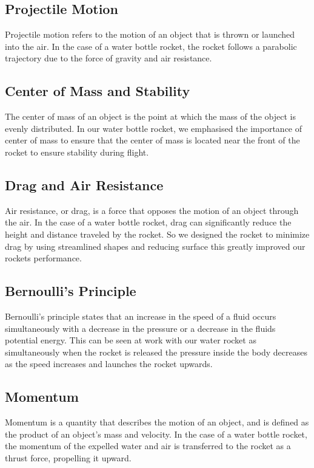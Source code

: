 \documentclass[11pt]{article}
\begin{document}
\subsection{Projectile Motion}

Projectile motion refers to the motion of an object that is thrown or launched into the air. In the case of a water bottle rocket, the rocket follows a parabolic trajectory due to the force of gravity and air resistance.

\subsection{Center of Mass and Stability}

The center of mass of an object is the point at which the mass of the object is evenly distributed. In our water bottle rocket, we emphasised the importance of center of mass to ensure that the center of mass is located near the front of the rocket to ensure stability during flight.

\subsection{Drag and Air Resistance}

Air resistance, or drag, is a force that opposes the motion of an object through the air. In the case of a water bottle rocket, drag can significantly reduce the height and distance traveled by the rocket. So we designed the rocket to minimize drag by using streamlined shapes and reducing surface this greatly improved our rockets performance.

\subsection{Bernoulli's Principle}

Bernoulli's principle states that an increase in the speed of a fluid occurs simultaneously with a decrease in the pressure or a decrease in the fluids potential energy. This can be seen at work with our water rocket as simultaneously when the rocket is released the pressure inside the body decreases as the speed increases and launches the rocket upwards. 

\subsection{Momentum}

Momentum is a quantity that describes the motion of an object, and is defined as the product of an object's mass and velocity. In the case of a water bottle rocket, the momentum of the expelled water and air is transferred to the rocket as a thrust force, propelling it upward.
\end{document}

